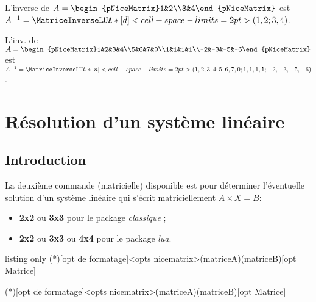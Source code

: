 \documentclass[a4paper,11pt]{article}
\begin{document}
\begin{PresentationCode}{}
L'inverse de $A=\begin{pNiceMatrix}1&2\\3&4\end{pNiceMatrix}$ est
$A^{-1}=\MatriceInverseLUA*[d]<cell-space-limits=2pt>(1,2;3,4)$.
\end{PresentationCode}

\begin{PresentationCode}{}
L'inv. de $A=\begin{pNiceMatrix}1&2&3&4\\5&6&7&0\\1&1&1&1\\-2&-3&-5&-6\end{pNiceMatrix}$ est
$A^{-1}=\MatriceInverseLUA*[n]<cell-space-limits=2pt>(1,2,3,4;5,6,7,0;1,1,1,1;-2,-3,-5,-6)$.
\end{PresentationCode}

\section{Résolution d'un système linéaire}

\subsection{Introduction}

\begin{cautionblock}
La deuxième commande (matricielle) disponible est pour déterminer l'éventuelle solution d'un système linéaire  qui s'écrit matriciellement $A\times X=B$:

\begin{itemize}
	\item \textbf{2x2} ou \textbf{3x3} pour le package \textit{classique} ;
	\item \textbf{2x2} ou \textbf{3x3} ou \textbf{4x4} pour le package \textit{lua}.
\end{itemize}
\end{cautionblock}

\begin{PresentationCode}{listing only}
\SolutionSysteme(*)[opt de formatage]<opts nicematrix>(matriceA)(matriceB)[opt Matrice]

\SolutionSystemeLUA(*)[opt de formatage]<opts nicematrix>(matriceA)(matriceB)[opt Matrice]
\end{PresentationCode}
\end{document}
